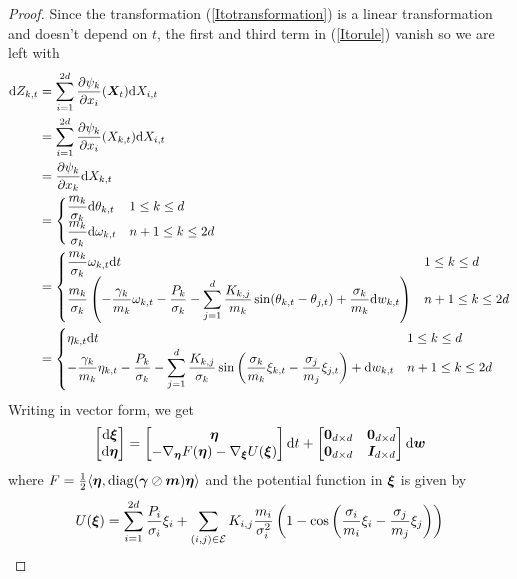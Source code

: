 \documentclass[11pt,twoside,a4paper]{article}
\begin{document}
\begin{proof}
Since the transformation (\ref{Itotransformation}) is a linear transformation and doesn't depend on $t$, the first and third term in (\ref{Itorule})  vanish so we are left with
\begin{align}
    {\rm{d}} Z_{k,t}& = \sum_{i=1}^{2d} \frac{\partial \psi_k}{\partial x_i}({\bm{X}}_t) {\rm{d}} X_{i,t} \nonumber \\ &= \sum_{i=1}^{2d} \frac{\partial \psi_k}{\partial x_i}(X_{k,t}) {\rm{d}} X_{i,t} \nonumber  \\
    &= \frac{\partial \psi_k}{\partial x_k} {\rm{d}} X_{k,t} \nonumber \\ 
    & = \begin{cases}
    \dfrac{m_k}{\sigma_k}{\rm{d}} \theta_{k,t} & 1\leq k \leq d \nonumber \\ 
     \dfrac{m_k}{\sigma_k}{\rm{d}} \omega_{k,t} & n+1 \leq k \leq 2d \\ 
    \end{cases} \nonumber \\ 
    &=  \begin{cases}
    \dfrac{m_k}{\sigma_k} \omega_{k,t} {\rm{d}} t & 1\leq k \leq d \nonumber \\ 
  \dfrac{m_k}{\sigma_k}  \left(-\dfrac{\gamma_k}{m_k} \omega_{k,t}- \dfrac{P_k}{\sigma_k}- \displaystyle \sum_{j=1}^d \dfrac{K_{k,j}}{m_k}\sin(\theta_{k,t}-\theta_{j,t})+ \dfrac{\sigma_k}{m_k}{\rm{d}} w_{k,t}\right) & n+1 \leq k \leq 2d
    \end{cases} \nonumber \\ 
    & = \begin{cases}
    \eta_{k,t} {\rm{d}} t & 1\leq k \leq d \nonumber \\ 
    -\dfrac{\gamma_k}{m_k} \eta_{k,t}- \dfrac{P_k}{\sigma_k}- \displaystyle \sum_{j=1}^d \dfrac{K_{k,j}}{\sigma_k}\sin\left(\dfrac{\sigma_k}{m_k}\xi_{k,t}-\dfrac{\sigma_j}{m_j}\xi_{j,t}\right)+{\rm{d}} w_{k,t} & n+1 \leq k \leq 2d
    \end{cases} 
\end{align}
Writing in vector form, we get 
\begin{align}
\begin{bmatrix}
{\rm{d}} {\bm{\xi}} \\
  {\rm{d}} {\bm{\eta}}
\end{bmatrix}
= \begin{bmatrix}
 {\bm{\eta}} \\ 
      -\nabla_{{\bm{\eta}}}F({\bm{\eta}})- \nabla_{{\bm{\xi}}}U({\bm{\xi}}) 
\end{bmatrix} {\rm{d}} t
+
 \begin{bmatrix}
     \bm{0}_{d\times d} & \bm{0}_{d\times d} \\ 
   \bm{0}_{d\times d}&\bm{I}_{d\times d}
    \end{bmatrix} {\rm{d}} \bm{w}
\end{align}
where $F=\frac{1}{2} \langle {\bm{\eta}},{\rm{diag}}({\bm{\gamma}}\oslash {\bm{m}}){\bm{\eta}} \rangle$ and the potential function in ${\bm{\xi}}$ is given by
\begin{align}
    U({\bm{\xi}}) = \sum_{i=1}^{2d}\frac{P_i}{\sigma_i} \xi_i + \sum_{(i,j)\in \mathcal{E}} K_{i,j}\frac{m_i}{\sigma_i^2}\left( 1-\cos\left(\dfrac{\sigma_i}{m_i}\xi_i-\frac{\sigma_j}{m_j}\xi_j\right)\right)
\end{align}
\end{proof}
\end{document}
